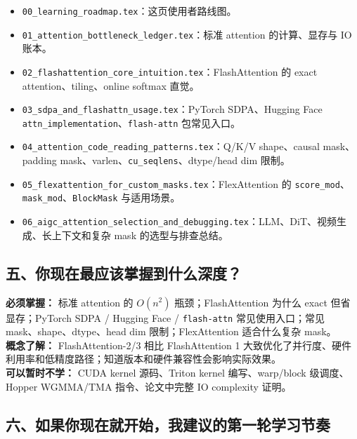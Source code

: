 \begin{itemize}[leftmargin=1.5em]
  \item \texttt{00\_learning\_roadmap.tex}：这页使用者路线图。
  \item \texttt{01\_attention\_bottleneck\_ledger.tex}：标准 attention 的计算、显存与 IO 账本。
  \item \texttt{02\_flashattention\_core\_intuition.tex}：FlashAttention 的 exact attention、tiling、online softmax 直觉。
  \item \texttt{03\_sdpa\_and\_flashattn\_usage.tex}：PyTorch SDPA、Hugging Face \texttt{attn\_implementation}、\texttt{flash-attn} 包常见入口。
  \item \texttt{04\_attention\_code\_reading\_patterns.tex}：Q/K/V shape、causal mask、padding mask、varlen、\texttt{cu\_seqlens}、dtype/head dim 限制。
  \item \texttt{05\_flexattention\_for\_custom\_masks.tex}：FlexAttention 的 \texttt{score\_mod}、\texttt{mask\_mod}、\texttt{BlockMask} 与适用场景。
  \item \texttt{06\_aigc\_attention\_selection\_and\_debugging.tex}：LLM、DiT、视频生成、长上下文和复杂 mask 的选型与排查总结。
\end{itemize}

\subsection{五、你现在最应该掌握到什么深度？}

\begin{summarybox}
\textbf{必须掌握：} 标准 attention 的 $O(n^2)$ 瓶颈；FlashAttention 为什么 exact 但省显存；PyTorch SDPA / Hugging Face / \texttt{flash-attn} 常见使用入口；常见 mask、shape、dtype、head dim 限制；FlexAttention 适合什么复杂 mask。\\
\textbf{概念了解：} FlashAttention-2/3 相比 FlashAttention 1 大致优化了并行度、硬件利用率和低精度路径；知道版本和硬件兼容性会影响实际效果。\\
\textbf{可以暂时不学：} CUDA kernel 源码、Triton kernel 编写、warp/block 级调度、Hopper WGMMA/TMA 指令、论文中完整 IO complexity 证明。
\end{summarybox}

\subsection{六、如果你现在就开始，我建议的第一轮学习节奏}

